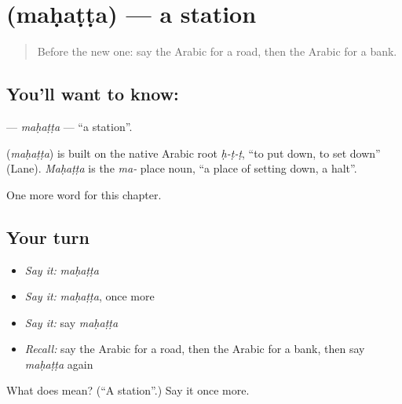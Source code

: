\section[\texorpdfstring{\ar{محطة} (maḥaṭṭa)}{محطة (maḥaṭṭa)}]{ (maḥaṭṭa) — a station}

\label{lesson:AR-C91-mahatta}



\begin{quote}
Before the new one: say the Arabic for a road, then the Arabic for a bank.
\end{quote}

\subsection*{You'll want to know: }
\textbf{} — \emph{maḥaṭṭa} — \textquotedblleft{}a station\textquotedblright{}.

\begin{cousinweb}
\textbf{} (\emph{maḥaṭṭa}) is built on the native Arabic root \emph{ḥ-ṭ-ṭ}, \textquotedblleft{}to put down, to set down\textquotedblright{} (Lane). \emph{Maḥaṭṭa} is the \emph{ma-} place noun, \textquotedblleft{}a place of setting down, a halt\textquotedblright{}.
\end{cousinweb}

\begin{grammarlens}[title={What you've built}]
One more word for this chapter.
\end{grammarlens}

\subsection*{Your turn}
\begin{itemize}
\raggedright
  \item \emph{Say it:} \emph{maḥaṭṭa}
  \item \emph{Say it:} \emph{maḥaṭṭa}, once more
  \item \emph{Say it:} say \emph{maḥaṭṭa}
  \item \emph{Recall:} say the Arabic for a road, then the Arabic for a bank, then say \emph{maḥaṭṭa} again
\end{itemize}

\begin{tcolorbox}[breakable,colback=teal!4,colframe=teal!35!black,title={Before you move on}]
What does  mean? (\textquotedblleft{}A station\textquotedblright{}.) Say it once more.
\end{tcolorbox}
